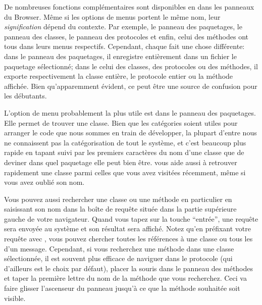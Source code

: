 \documentclass[a4paper,10pt,twoside]{book}
\begin{document}
De nombreuses fonctions complémentaires sont disponibles 
en \actclickant{} dans les panneaux du Browser.
Même si les options de menus portent le même nom,
leur \emph{signification} dépend du contexte.
Par exemple, le panneau des paquetages, le
panneau des classes, le panneau des protocoles et enfin, celui des méthodes
ont tous  dans leurs menus respectifs. Cependant, chaque 
 fait une chose différente: dans le panneau des paquetages,
il enregistre entièrement dans un fichier le paquetage
sélectionné; dans le celui des classes, des protocoles ou des
méthodes, il exporte respectivement la classe entière, le protocole
entier ou la méthode affichée. %
Bien qu'apparemment évident, ce peut être une source de confusion pour
les débutants. 

L'option de menu probablement la plus utile est  
dans le panneau des paquetages. 
Elle permet de trouver une classe.
Bien que les catégories soient utiles pour arranger le code que nous 
sommes en train de développer, la plupart d'entre nous ne connaissent pas
la catégorisation de tout le système, et c'est beaucoup plus rapide
en tapant  suivi par les premiers caractères du nom d'une 
classe que de deviner dans quel paquetage elle peut bien être.
 vous aide aussi à retrouver rapidement
une classe parmi celles que vous avez visitées récemment, même si vous
avez oublié son nom.

Vous pouvez aussi rechercher une classe ou une méthode en particulier en
saisissant son nom dans la boîte de requête située dans la partie 
supérieure gauche de votre navigateur. Quand vous tapez
sur la touche ``entrée'', une requête sera envoyée au système et son
résultat sera affiché. %
Notez qu'en préfixant votre requête avec \ct{#}, vous pouvez chercher
toutes les références à une classe ou tous les \senders d'un
message.
Cependant, si vous recherchez une méthode dans une classe sélectionnée, il est
souvent plus efficace de naviguer dans le protocole  
(qui d'ailleurs est le choix par défaut), placer la souris dans le
panneau des méthodes et taper la première lettre du nom de la méthode
que vous recherchez. %
Ceci va faire glisser l'ascenseur du panneau jusqu'à ce que la méthode souhaitée soit visible.
\end{document}
